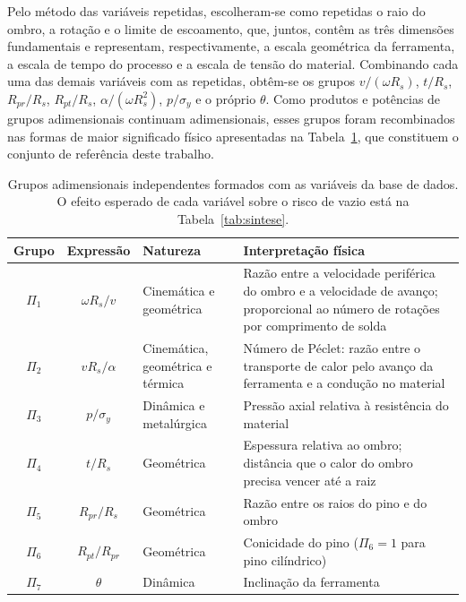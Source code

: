 \documentclass[12pt,openany]{report}
\begin{document}
Pelo método das variáveis repetidas, escolheram-se como repetidas o raio do ombro, a rotação e o limite de escoamento, que, juntos, contêm as três dimensões fundamentais e representam, respectivamente, a escala geométrica da ferramenta, a escala de tempo do processo e a escala de tensão do material. Combinando cada uma das demais variáveis com as repetidas, obtêm-se os grupos $v/(\omega R_s)$, $t/R_s$, $R_{pr}/R_s$, $R_{pt}/R_s$, $\alpha/(\omega R_{s}^{2})$, $p/\sigma_y$ e o próprio $\theta$. Como produtos e potências de grupos adimensionais continuam adimensionais, esses grupos foram recombinados nas formas de maior significado físico apresentadas na Tabela~\ref{tab:grupos}, que constituem o conjunto de referência deste trabalho.

\begin{table}[htbp]
\centering
\caption{Grupos adimensionais independentes formados com as variáveis da base de dados. O efeito esperado de cada variável sobre o risco de vazio está na Tabela~\ref{tab:sintese}.}
\label{tab:grupos}
\small
\begin{tabularx}{\textwidth}{c c L{2.8cm} Y}
\toprule
\textbf{Grupo} & \textbf{Expressão} & \textbf{Natureza} & \textbf{Interpretação física} \\ \midrule
$\Pi_1$ & $\omega R_s/v$ & Cinemática e geométrica & Razão entre a velocidade periférica do ombro e a velocidade de avanço; proporcional ao número de rotações por comprimento de solda \\
$\Pi_2$ & $v R_s/\alpha$ & Cinemática, geométrica e térmica & Número de Péclet: razão entre o transporte de calor pelo avanço da ferramenta e a condução no material \\
$\Pi_3$ & $p/\sigma_y$ & Dinâmica e metalúrgica & Pressão axial relativa à resistência do material \\
$\Pi_4$ & $t/R_s$ & Geométrica & Espessura relativa ao ombro; distância que o calor do ombro precisa vencer até a raiz \\
$\Pi_5$ & $R_{pr}/R_s$ & Geométrica & Razão entre os raios do pino e do ombro \\
$\Pi_6$ & $R_{pt}/R_{pr}$ & Geométrica & Conicidade do pino ($\Pi_6 = 1$ para pino cilíndrico) \\
$\Pi_7$ & $\theta$ & Dinâmica & Inclinação da ferramenta \\ \bottomrule
\end{tabularx}
\end{table}
\end{document}
